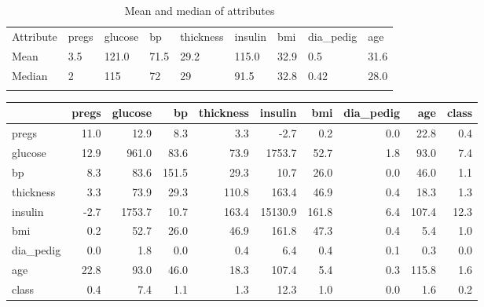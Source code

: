 \begin{table}[]
\centering
\caption{Mean and median of attributes}
\label{my-label}
\begin{tabular}{lllllllll}
\cline{1-1}
\multicolumn{1}{|l|}{Attribute} & pregs & glucose & bp   & thickness & insulin & bmi  & dia\_pedig & age  \\ \cline{1-1}
\multicolumn{1}{|l|}{Mean}      & 3.5   & 121.0   & 71.5 & 29.2      & 115.0   & 32.9 & 0.5        & 31.6 \\ \cline{1-1}
\multicolumn{1}{|l|}{Median}    & 2     & 115     & 72   & 29        & 91.5    & 32.8 & 0.42       & 28.0 \\ \cline{1-1}
                                                       &       &         &      &           &         &      &            &      \\ \hline
\end{tabular}
\end{table}

\begin{tabular}{lrrrrrrrrr}
\toprule
\caption{Covariance matrix}
{} &  pregs &  glucose &     bp &  thickness &  insulin &    bmi &  dia\_pedig &    age &  class \\
\midrule
pregs     &   11.0 &     12.9 &    8.3 &        3.3 &     -2.7 &    0.2 &        0.0 &   22.8 &    0.4 \\
glucose   &   12.9 &    961.0 &   83.6 &       73.9 &   1753.7 &   52.7 &        1.8 &   93.0 &    7.4 \\
bp        &    8.3 &     83.6 &  151.5 &       29.3 &     10.7 &   26.0 &        0.0 &   46.0 &    1.1 \\
thickness &    3.3 &     73.9 &   29.3 &      110.8 &    163.4 &   46.9 &        0.4 &   18.3 &    1.3 \\
insulin   &   -2.7 &   1753.7 &   10.7 &      163.4 &  15130.9 &  161.8 &        6.4 &  107.4 &   12.3 \\
bmi       &    0.2 &     52.7 &   26.0 &       46.9 &    161.8 &   47.3 &        0.4 &    5.4 &    1.0 \\
dia\_pedig &    0.0 &      1.8 &    0.0 &        0.4 &      6.4 &    0.4 &        0.1 &    0.3 &    0.0 \\
age       &   22.8 &     93.0 &   46.0 &       18.3 &    107.4 &    5.4 &        0.3 &  115.8 &    1.6 \\
class     &    0.4 &      7.4 &    1.1 &        1.3 &     12.3 &    1.0 &        0.0 &    1.6 &    0.2 \\
\bottomrule
\end{tabular}
